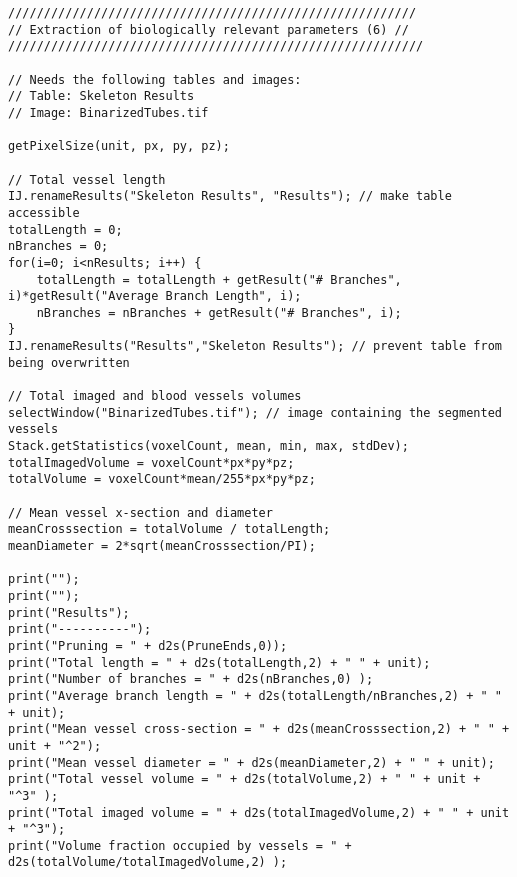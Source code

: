 \begin{lstlisting}
/////////////////////////////////////////////////////////
// Extraction of biologically relevant parameters (6) //
//////////////////////////////////////////////////////////

// Needs the following tables and images:
// Table: Skeleton Results
// Image: BinarizedTubes.tif

getPixelSize(unit, px, py, pz);

// Total vessel length
IJ.renameResults("Skeleton Results", "Results"); // make table accessible
totalLength = 0;
nBranches = 0;
for(i=0; i<nResults; i++) {
	totalLength = totalLength + getResult("# Branches", i)*getResult("Average Branch Length", i);
	nBranches = nBranches + getResult("# Branches", i);	
}
IJ.renameResults("Results","Skeleton Results"); // prevent table from being overwritten 

// Total imaged and blood vessels volumes
selectWindow("BinarizedTubes.tif"); // image containing the segmented vessels
Stack.getStatistics(voxelCount, mean, min, max, stdDev);
totalImagedVolume = voxelCount*px*py*pz;
totalVolume = voxelCount*mean/255*px*py*pz;

// Mean vessel x-section and diameter
meanCrosssection = totalVolume / totalLength;
meanDiameter = 2*sqrt(meanCrosssection/PI);

print("");
print("");
print("Results");
print("----------");
print("Pruning = " + d2s(PruneEnds,0));
print("Total length = " + d2s(totalLength,2) + " " + unit);
print("Number of branches = " + d2s(nBranches,0) ); 
print("Average branch length = " + d2s(totalLength/nBranches,2) + " " + unit); 
print("Mean vessel cross-section = " + d2s(meanCrosssection,2) + " " + unit + "^2");
print("Mean vessel diameter = " + d2s(meanDiameter,2) + " " + unit);
print("Total vessel volume = " + d2s(totalVolume,2) + " " + unit + "^3" );
print("Total imaged volume = " + d2s(totalImagedVolume,2) + " " + unit + "^3");
print("Volume fraction occupied by vessels = " + d2s(totalVolume/totalImagedVolume,2) );

\end{lstlisting}